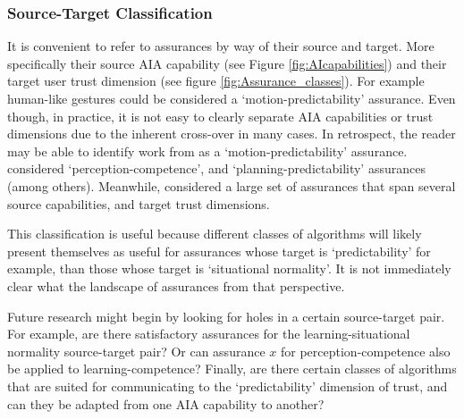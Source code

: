 \subsubsection{Source-Target Classification}
It is convenient to refer to assurances by way of their source and target. More specifically their source AIA capability (see Figure \ref{fig:AIcapabilities}) and their target user trust dimension (see figure \ref{fig:Assurance_classes}). For example human-like gestures could be considered a `motion-predictability' assurance. Even though, in practice, it is not easy to clearly separate AIA capabilities or trust dimensions due to the inherent cross-over in many cases. In retrospect, the reader may be able to identify work from \cite{Dragan2013-wd} as a `motion-predictability' assurance. \citet{Wang2016-id} considered `perception-competence', and `planning-predictability' assurances (among others). Meanwhile, \citet{Aitken2016-fb} considered a large set of assurances that span several source capabilities, and target trust dimensions. 

This classification is useful because different classes of algorithms will likely present themselves as useful for assurances whose target is `predictability' for example, than those whose target is `situational normality'. It is not immediately clear what the landscape of assurances from that perspective.

Future research might begin by looking for holes in a certain source-target pair. For example, are there satisfactory assurances for the learning-situational normality source-target pair? Or can assurance $x$ for perception-competence also be applied to learning-competence? Finally, are there certain classes of algorithms that are suited for communicating to the `predictability' dimension of trust, and can they be adapted from one AIA capability to another?

%

